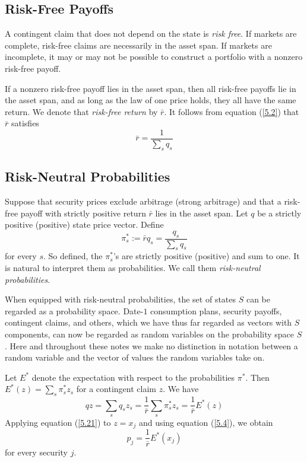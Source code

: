 \documentclass[\topdir/lecture\_notes.tex]{subfiles}
\begin{document}
\subsection{Risk-Free Payoffs}
A contingent claim that does not depend on the state is \emph{risk free}. If markets are complete, risk-free claims are necessarily in the asset span. If markets are incomplete, it may or may not be possible to construct a portfolio with a nonzero risk-free payoff.

If a nonzero risk-free payoff lies in the asset span, then all risk-free payoffs lie in the asset span, and as long as the law of one price holds, they all have the same return. We denote that \emph{risk-free return} by $\bar{r}$. It follows from equation (\ref{5.2}) that $\bar{r}$ satisfies
\begin{equation*}
\bar{r}=\frac{1}{\sum_{s} q_{s}} \label{eq:risk_free_return} 
\end{equation*}

\subsection{Risk-Neutral Probabilities}
Suppose that security prices exclude arbitrage (strong arbitrage) and that a risk-free payoff with strictly positive return $\bar{r}$ lies in the asset span. Let $q$ be a strictly positive (positive) state price vector. Define
\begin{equation*}
\pi_{s}^{*} := \bar{r} q_{s}=\frac{q_{s}}{\sum_{s} q_{s}} \label{eq:risk_neutral_probabilities} 
\end{equation*}
for every $s$. So defined, the $\pi_{s}^{*}$'s are strictly positive (positive) and sum to one. It is natural to interpret them as probabilities. We call them \emph{risk-neutral probabilities}.

When equipped with risk-neutral probabilities, the set of states $S$ can be regarded as a probability space. Date-$1$ consumption plans, security payoffs, contingent claims, and others, which we have thus far regarded as vectors with $S$ components, can now be regarded as random variables on the probability space $S$. Here and throughout these notes we make no distinction in notation between a random variable and the vector of values the random variables take on.

Let $E^{*}$ denote the expectation with respect to the probabilities $\pi^{*}$. Then $E^{*}(z)=\sum_{s} \pi_{s}^{*} z_{s}$ for a contingent claim $z$. We have
\begin{equation}
q z=\sum_{s} q_{s} z_{s}=\frac{1}{\bar{r}} \sum_{s} \pi_{s}^{*} z_{s}=\frac{1}{\bar{r}} E^{*}(z) \label{5.21}
\end{equation}
Applying equation (\ref{5.21}) to $z=x_{j}$ and using equation (\ref{5.4}), we obtain
\begin{equation}
p_{j}=\frac{1}{\bar{r}} E^{*}\left(x_{j}\right) \label{5.22}
\end{equation}
for every security $j$.
\end{document}
